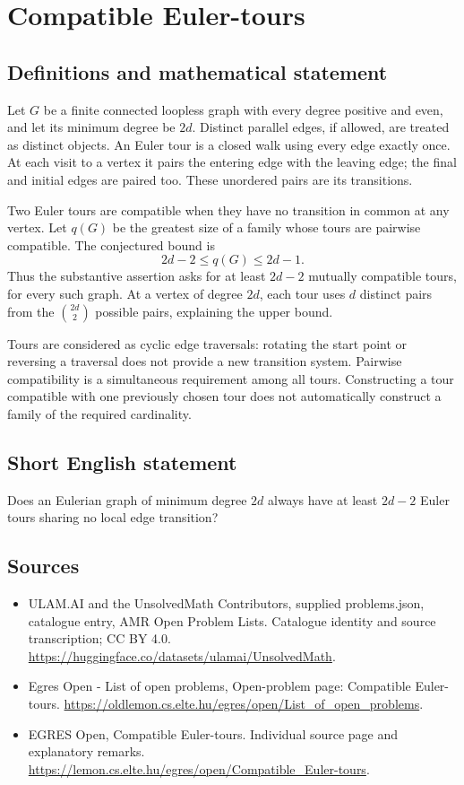 \documentclass[11pt,a4paper]{article}
\begin{document}
\section*{Compatible Euler-tours}\label{statement}

\subsection{Definitions and mathematical statement}
Let $G$ be a finite connected loopless graph with every degree positive
and even, and let its minimum degree be $2d$. Distinct parallel edges,
if allowed, are treated as distinct objects. An Euler tour is a closed
walk using every edge exactly once. At each visit to a vertex it pairs
the entering edge with the leaving edge; the final and initial edges
are paired too. These unordered pairs are its transitions.

Two Euler tours are compatible when they have no transition in common
at any vertex. Let $q(G)$ be the greatest size of a family whose tours
are pairwise compatible. The conjectured bound is
\[
                         2d-2\le q(G)\le2d-1.
\]
Thus the substantive assertion asks for at least $2d-2$ mutually
compatible tours, for every such graph. At a vertex of degree $2d$, each
tour uses $d$ distinct pairs from the $\binom{2d}{2}$ possible pairs,
explaining the upper bound.

Tours are considered as cyclic edge traversals: rotating the start point
or reversing a traversal does not provide a new transition system.
Pairwise compatibility is a simultaneous requirement among all tours.
Constructing a tour compatible with one previously chosen tour does
not automatically construct a family of the required cardinality.
\subsection{Short English statement}
Does an Eulerian graph of minimum degree $2d$ always have at least
$2d-2$ Euler tours sharing no local edge transition?
\subsection{Sources}
\begin{itemize}
\item[S1] ULAM.AI and the UnsolvedMath Contributors, supplied problems.json, catalogue entry, AMR Open Problem Lists. Catalogue identity and source transcription; CC BY 4.0.
\url{https://huggingface.co/datasets/ulamai/UnsolvedMath}.
\item[S2] Egres Open - List of open problems, Open-problem page: Compatible Euler-tours. 
\url{https://oldlemon.cs.elte.hu/egres/open/List_of_open_problems}.
\item[S3] EGRES Open, Compatible Euler-tours. Individual source page and explanatory remarks.
\url{https://lemon.cs.elte.hu/egres/open/Compatible_Euler-tours}.
\end{itemize}
\end{document}
